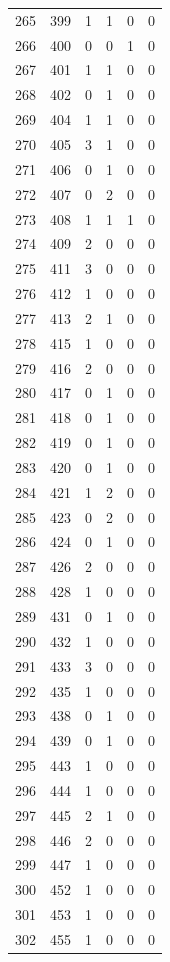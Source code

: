 \documentclass[
  letterpaper,
  DIV=11,
  numbers=noendperiod]{scrreprt}
\begin{document}
\begin{longtable}[]{@{}rrrrrr@{}}
265 & 399 & 1 & 1 & 0 & 0 \\
266 & 400 & 0 & 0 & 1 & 0 \\
267 & 401 & 1 & 1 & 0 & 0 \\
268 & 402 & 0 & 1 & 0 & 0 \\
269 & 404 & 1 & 1 & 0 & 0 \\
270 & 405 & 3 & 1 & 0 & 0 \\
271 & 406 & 0 & 1 & 0 & 0 \\
272 & 407 & 0 & 2 & 0 & 0 \\
273 & 408 & 1 & 1 & 1 & 0 \\
274 & 409 & 2 & 0 & 0 & 0 \\
275 & 411 & 3 & 0 & 0 & 0 \\
276 & 412 & 1 & 0 & 0 & 0 \\
277 & 413 & 2 & 1 & 0 & 0 \\
278 & 415 & 1 & 0 & 0 & 0 \\
279 & 416 & 2 & 0 & 0 & 0 \\
280 & 417 & 0 & 1 & 0 & 0 \\
281 & 418 & 0 & 1 & 0 & 0 \\
282 & 419 & 0 & 1 & 0 & 0 \\
283 & 420 & 0 & 1 & 0 & 0 \\
284 & 421 & 1 & 2 & 0 & 0 \\
285 & 423 & 0 & 2 & 0 & 0 \\
286 & 424 & 0 & 1 & 0 & 0 \\
287 & 426 & 2 & 0 & 0 & 0 \\
288 & 428 & 1 & 0 & 0 & 0 \\
289 & 431 & 0 & 1 & 0 & 0 \\
290 & 432 & 1 & 0 & 0 & 0 \\
291 & 433 & 3 & 0 & 0 & 0 \\
292 & 435 & 1 & 0 & 0 & 0 \\
293 & 438 & 0 & 1 & 0 & 0 \\
294 & 439 & 0 & 1 & 0 & 0 \\
295 & 443 & 1 & 0 & 0 & 0 \\
296 & 444 & 1 & 0 & 0 & 0 \\
297 & 445 & 2 & 1 & 0 & 0 \\
298 & 446 & 2 & 0 & 0 & 0 \\
299 & 447 & 1 & 0 & 0 & 0 \\
300 & 452 & 1 & 0 & 0 & 0 \\
301 & 453 & 1 & 0 & 0 & 0 \\
302 & 455 & 1 & 0 & 0 & 0 \\

\end{longtable}
\end{document}
